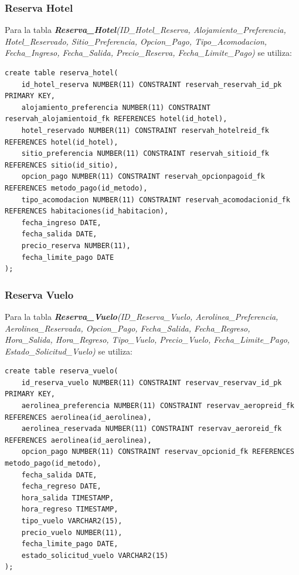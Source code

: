 \documentclass{article}
\begin{document}
\subsubsection{Reserva Hotel}

Para la tabla \textit{\textbf{Reserva\_Hotel}(ID\_Hotel\_Reserva, Alojamiento\_Preferencia, Hotel\_Reservado, Sitio\_Preferencia, Opcion\_Pago, Tipo\_Acomodacion, Fecha\_Ingreso, Fecha\_Salida, Precio\_Reserva, Fecha\_Limite\_Pago)} se utiliza:

\begin{lstlisting}
create table reserva_hotel(
    id_hotel_reserva NUMBER(11) CONSTRAINT reservah_reservah_id_pk PRIMARY KEY,
    alojamiento_preferencia NUMBER(11) CONSTRAINT reservah_alojamientoid_fk REFERENCES hotel(id_hotel),
    hotel_reservado NUMBER(11) CONSTRAINT reservah_hotelreid_fk REFERENCES hotel(id_hotel),
    sitio_preferencia NUMBER(11) CONSTRAINT reservah_sitioid_fk REFERENCES sitio(id_sitio),
    opcion_pago NUMBER(11) CONSTRAINT reservah_opcionpagoid_fk REFERENCES metodo_pago(id_metodo),
    tipo_acomodacion NUMBER(11) CONSTRAINT reservah_acomodacionid_fk REFERENCES habitaciones(id_habitacion),
    fecha_ingreso DATE,
    fecha_salida DATE,
    precio_reserva NUMBER(11),
    fecha_limite_pago DATE
);
\end{lstlisting}


\subsubsection{Reserva Vuelo}

Para la tabla \textit{\textbf{Reserva\_Vuelo}(ID\_Reserva\_Vuelo, Aerolinea\_Preferencia, Aerolinea\_Reservada, Opcion\_Pago, Fecha\_Salida, Fecha\_Regreso, Hora\_Salida, Hora\_Regreso, Tipo\_Vuelo, Precio\_Vuelo, Fecha\_Limite\_Pago, Estado\_Solicitud\_Vuelo)} se utiliza:

\begin{lstlisting}
create table reserva_vuelo(
    id_reserva_vuelo NUMBER(11) CONSTRAINT reservav_reservav_id_pk PRIMARY KEY,
    aerolinea_preferencia NUMBER(11) CONSTRAINT reservav_aeropreid_fk REFERENCES aerolinea(id_aerolinea),
    aerolinea_reservada NUMBER(11) CONSTRAINT reservav_aeroreid_fk REFERENCES aerolinea(id_aerolinea),
    opcion_pago NUMBER(11) CONSTRAINT reservav_opcionid_fk REFERENCES metodo_pago(id_metodo),
    fecha_salida DATE,
    fecha_regreso DATE,
    hora_salida TIMESTAMP,
    hora_regreso TIMESTAMP,
    tipo_vuelo VARCHAR2(15),
    precio_vuelo NUMBER(11),
    fecha_limite_pago DATE,
    estado_solicitud_vuelo VARCHAR2(15)
);
\end{lstlisting}
\end{document}
